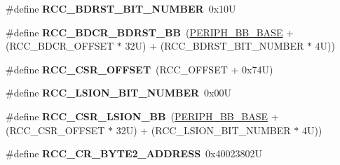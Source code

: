 \begin{DoxyCompactItemize}
\item 
\mbox{\label{group___r_c_c___bit_address___alias_region_ga68b0f7a13e733453c7efcd66a6ee251d}} 
\#define {\bfseries R\+C\+C\+\_\+\+B\+D\+R\+S\+T\+\_\+\+B\+I\+T\+\_\+\+N\+U\+M\+B\+ER}~0x10U
\item 
\mbox{\label{group___r_c_c___bit_address___alias_region_ga5e5805d3c5b9ad3ebc13e030e5fdd86c}} 
\#define {\bfseries R\+C\+C\+\_\+\+B\+D\+C\+R\+\_\+\+B\+D\+R\+S\+T\+\_\+\+BB}~(\mbox{\hyperlink{group___peripheral__memory__map_gaed7efc100877000845c236ccdc9e144a}{P\+E\+R\+I\+P\+H\+\_\+\+B\+B\+\_\+\+B\+A\+SE}} + (R\+C\+C\+\_\+\+B\+D\+C\+R\+\_\+\+O\+F\+F\+S\+ET $\ast$ 32\+U) + (\+R\+C\+C\+\_\+\+B\+D\+R\+S\+T\+\_\+\+B\+I\+T\+\_\+\+N\+U\+M\+B\+E\+R $\ast$ 4\+U))
\item 
\mbox{\label{group___r_c_c___bit_address___alias_region_ga63141585a221eed1fd009eb80e406619}} 
\#define {\bfseries R\+C\+C\+\_\+\+C\+S\+R\+\_\+\+O\+F\+F\+S\+ET}~(R\+C\+C\+\_\+\+O\+F\+F\+S\+ET + 0x74\+U)
\item 
\mbox{\label{group___r_c_c___bit_address___alias_region_ga577ffeb20561aa8395fe5327807b5709}} 
\#define {\bfseries R\+C\+C\+\_\+\+L\+S\+I\+O\+N\+\_\+\+B\+I\+T\+\_\+\+N\+U\+M\+B\+ER}~0x00U
\item 
\mbox{\label{group___r_c_c___bit_address___alias_region_gac34a2d63deae3efc65e66f8fb3c26dae}} 
\#define {\bfseries R\+C\+C\+\_\+\+C\+S\+R\+\_\+\+L\+S\+I\+O\+N\+\_\+\+BB}~(\mbox{\hyperlink{group___peripheral__memory__map_gaed7efc100877000845c236ccdc9e144a}{P\+E\+R\+I\+P\+H\+\_\+\+B\+B\+\_\+\+B\+A\+SE}} + (R\+C\+C\+\_\+\+C\+S\+R\+\_\+\+O\+F\+F\+S\+ET $\ast$ 32\+U) + (\+R\+C\+C\+\_\+\+L\+S\+I\+O\+N\+\_\+\+B\+I\+T\+\_\+\+N\+U\+M\+B\+E\+R $\ast$ 4\+U))
\item 
\mbox{\label{group___r_c_c___bit_address___alias_region_ga1da336203f39dd57462e7f331271f699}} 
\#define {\bfseries R\+C\+C\+\_\+\+C\+R\+\_\+\+B\+Y\+T\+E2\+\_\+\+A\+D\+D\+R\+E\+SS}~0x40023802U
\item 
\mbox{\label{group___r_c_c___bit_address___alias_region_ga97f80d22ba3506a43accbeb9ceb31f51}} 

\end{DoxyCompactItemize}
